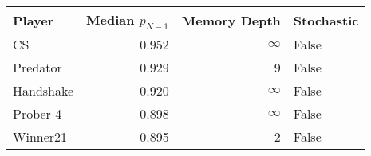 \begin{tabular}{lrrl}
\toprule
    Player &  Median $p_{N-1}$ &  Memory Depth & Stochastic \\
\midrule
        CS &             0.952 &            \(\infty\) &      False \\
  Predator &             0.929 &             9 &      False \\
 Handshake &             0.920 &            \(\infty\) &      False \\
  Prober 4 &             0.898 &            \(\infty\) &      False \\
  Winner21 &             0.895 &             2 &      False \\
\bottomrule
\end{tabular}
